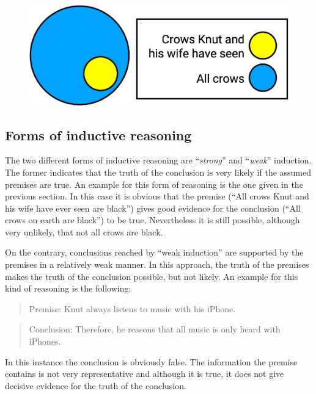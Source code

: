 \documentclass[
]{krantz}
\begin{document}
\begin{figure}

{\centering \includegraphics[width=0.6\linewidth]{images/ch9/fig4} 

}

\end{figure}

\hypertarget{forms-of-inductive-reasoning}{%
\subsection*{Forms of inductive reasoning}\label{forms-of-inductive-reasoning}}


The two different forms of inductive reasoning are ``\emph{strong}'' and ``\emph{weak}'' induction. The former indicates that the truth of the conclusion is very likely if the assumed premises are true. An example for this form of reasoning is the one given in the previous section. In this case it is obvious that the premise (``All crows Knut and his wife have ever seen are black'') gives good evidence for the conclusion (``All crows on earth are black'') to be true. Nevertheless it is still possible, although very unlikely, that not all crows are black.

On the contrary, conclusions reached by ``weak induction'' are supported by the premises in a relatively weak manner. In this approach, the truth of the premises makes the truth of the conclusion possible, but not likely. An example for this kind of reasoning is the following:

\begin{quote}
Premise: Knut always listens to music with his iPhone.
\end{quote}

\begin{quote}
Conclusion: Therefore, he reasons that all music is only heard with iPhones.
\end{quote}

In this instance the conclusion is obviously false. The information the premise contains is not very representative and although it is true, it does not give decisive evidence for the truth of the conclusion.
\end{document}
